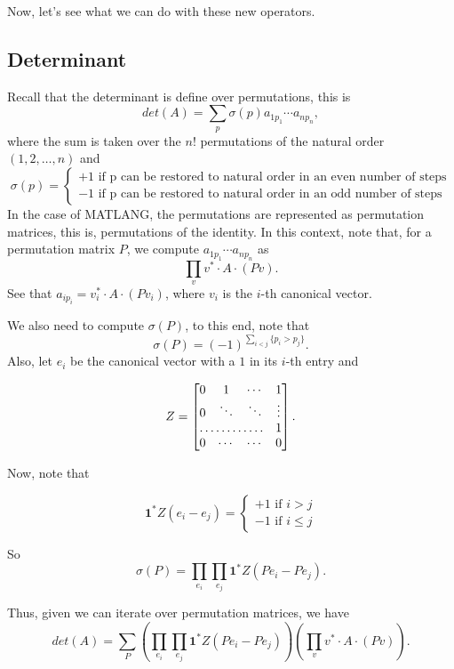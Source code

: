 Now, let's see what we can do with these new operators.

\subsection*{Determinant}

Recall that the determinant is define over permutations, this is $$det(A)=\sum_{p}\sigma(p)a_{1p_1}\cdots a_{np_n},$$ where the sum is taken over the $n!$ permutations of the natural order $(1, 2,\ldots, n)$ and 
       \[
  			\sigma(p)=\begin{cases}
               +1 \text{ if p can be restored to natural order in an even number of steps} \\
               -1 \text{ if p can be restored to natural order in an odd number of steps}
            \end{cases}
		\]
In the case of MATLANG, the permutations are represented as permutation matrices, this is, permutations of the identity. In this context, note that, for a permutation matrix $P$, we compute $a_{1p_1}\cdots a_{np_n}$ as $$\prod_v v^*\cdot A\cdot (Pv).$$ See that $a_{ip_i}=v_i^*\cdot A\cdot (Pv_i)$, where $v_i$ is the $i$-th canonical vector. 


We also need to compute $\sigma(P)$, to this end, note that $$\sigma(P)=(-1)^{\sum_{i<j}\lbrace p_i>p_j\rbrace}.$$ Also, let $e_i$ be the canonical vector with a $1$ in its $i$-th entry and 

\[
Z = \begin{bmatrix}
    0 & 1 & \cdots &  1 \\
    0 & \ddots & \ddots & \vdots \\
    \hdotsfor{3} & 1 \\
    0 & \cdots & \cdots & 0 
\end{bmatrix}.
\]

Now, note that 

 		\[
  			\mathbf{1}^*Z(e_i-e_j)=\begin{cases}
               +1 \text{ if } i > j \\
               -1 \text{ if } i \leq j
            \end{cases}
		\]

So $$\sigma(P)=\prod_{e_i}\prod_{e_j}\mathbf{1}^*Z(Pe_i-Pe_j).$$

Thus, given we can iterate over permutation matrices, we have $$det(A)=\sum_{P}\left(\prod_{e_i}\prod_{e_j}\mathbf{1}^*Z(Pe_i-Pe_j)\right)\left(\prod_v v^*\cdot A\cdot (Pv)\right).$$

